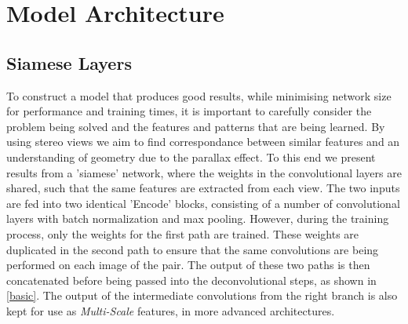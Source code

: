\documentclass[ %
                    author={Gavin Parker},
                supervisor={Dr. Neill Campbell},
                    degree={MEng},
                     title={Deep Siamese Networks for Illumination Estimation from Stereo Images},
                  subtitle={},
                      type={research},
                      year={2018} ]{dissertation}
\begin{document}
\section{Model Architecture}
\subsection{Siamese Layers}
To construct a model that produces good results, while minimising network size for performance and training times, it is important to carefully consider the problem being solved and the features and patterns that are being learned. By using stereo views we aim to find correspondance between similar features and an understanding of geometry due to the parallax effect. To this end we present results from a 'siamese' network, where the weights in the convolutional layers are shared, such that the same features are extracted from each view. The two inputs are fed into two identical 'Encode' blocks, consisting of a number of convolutional layers with batch normalization and max pooling. However, during the training process, only the weights for the first path are trained. These weights are duplicated in the second path to ensure that the same convolutions are being performed on each image of the pair. The output of these two paths is then concatenated before being passed into the deconvolutional steps, as shown in \ref{basic}. The output of the intermediate convolutions from the right branch is also kept for use as \textit{Multi-Scale} features, in more advanced architectures.
\end{document}
